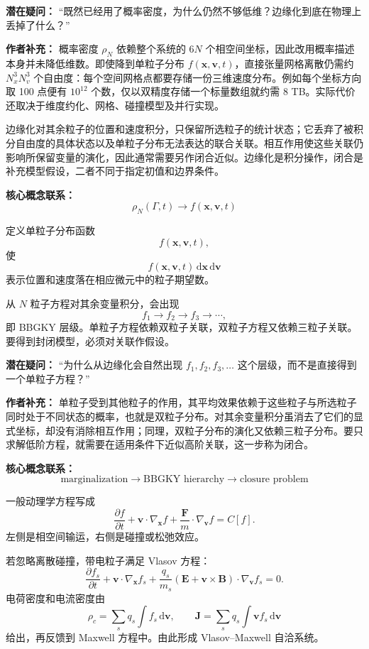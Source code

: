 \documentclass[11pt,openany]{ctexbook}
\newcommand{\dd}{\,\mathrm d}
\begin{document}
\begin{authornote}
\textbf{潜在疑问：}
“既然已经用了概率密度，为什么仍然不够低维？边缘化到底在物理上丢掉了什么？”

\textbf{作者补充：}
概率密度 \(\rho_N\) 依赖整个系统的 \(6N\) 个相空间坐标，因此改用概率描述本身并未降低维数。即使降到单粒子分布 \(f(\bm x,\bm v,t)\)，直接张量网格离散仍需约 \(N_x^3N_v^3\) 个自由度：每个空间网格点都要存储一份三维速度分布。例如每个坐标方向取 100 点便有 \(10^{12}\) 个数，仅以双精度存储一个标量数组就约需 8 TB。实际代价还取决于维度约化、网格、碰撞模型及并行实现。

边缘化对其余粒子的位置和速度积分，只保留所选粒子的统计状态；它丢弃了被积分自由度的具体状态以及单粒子分布无法表达的联合关联。相互作用使这些关联仍影响所保留变量的演化，因此通常需要另作闭合近似。边缘化是积分操作，闭合是补充模型假设，二者不同于指定初值和边界条件。

\textbf{核心概念联系：}
\[
\rho_N(\Gamma,t)
\longrightarrow
f(\bm x,\bm v,t)
\]
\end{authornote}

定义单粒子分布函数
\[
f(\bm x,\bm v,t),
\]
使
\[
f(\bm x,\bm v,t)\dd\bm x\dd\bm v
\]
表示位置和速度落在相应微元中的粒子期望数。

从 \(N\) 粒子方程对其余变量积分，会出现
\[
f_1\longrightarrow f_2\longrightarrow f_3\longrightarrow\cdots,
\]
即 BBGKY 层级。单粒子方程依赖双粒子关联，双粒子方程又依赖三粒子关联。要得到封闭模型，必须对关联作假设。

\begin{authornote}
\textbf{潜在疑问：}
“为什么从边缘化会自然出现 \(f_1,f_2,f_3,\dots\) 这个层级，而不是直接得到一个单粒子方程？”

\textbf{作者补充：}
单粒子受到其他粒子的作用，其平均效果依赖于这些粒子与所选粒子同时处于不同状态的概率，也就是双粒子分布。对其余变量积分虽消去了它们的显式坐标，却没有消除相互作用；同理，双粒子分布的演化又依赖三粒子分布。要只求解低阶方程，就需要在适用条件下近似高阶关联，这一步称为闭合。

\textbf{核心概念联系：}
\[
\text{marginalization}
\longrightarrow
\text{BBGKY hierarchy}
\longrightarrow
\text{closure problem}
\]
\end{authornote}

一般动理学方程写成
\[
\frac{\partial f}{\partial t}
+\bm v\cdot\nabla_{\bm x}f
+\frac{\bm F}{m}\cdot\nabla_{\bm v}f
=C[f].
\]
左侧是相空间输运，右侧是碰撞或松弛效应。

若忽略离散碰撞，带电粒子满足 Vlasov 方程：
\[
\frac{\partial f_s}{\partial t}
+\bm v\cdot\nabla_{\bm x}f_s
+\frac{q_s}{m_s}
(\bm E+\bm v\times\bm B)\cdot\nabla_{\bm v}f_s=0.
\]
电荷密度和电流密度由
\[
\rho_c=\sum_s q_s\int f_s\dd\bm v,
\qquad
\bm J=\sum_s q_s\int \bm v f_s\dd\bm v
\]
给出，再反馈到 Maxwell 方程中。由此形成 Vlasov--Maxwell 自洽系统。
\end{document}

